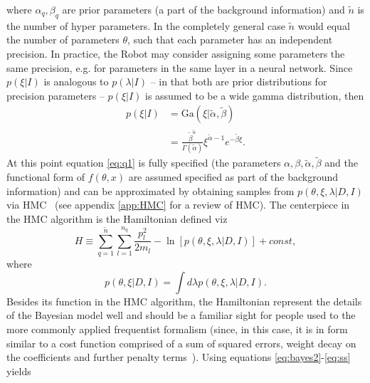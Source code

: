 	where $\alpha_q,\beta_q$ are prior parameters (a part of the background information) and $\tilde{n}$ is the number of hyper parameters. In the completely general case $\tilde{n}$ would equal the number of parameters $\theta$, such that each parameter has an independent precision. In practice, the Robot may consider assigning some parameters the same precision, e.g. for parameters in the same layer in a neural network. Since $p(\xi|I)$ is analogous to $p(\lambda|I)$ -- in that both are prior distributions for precision parameters -- $p(\xi|I)$ is assumed to be a wide gamma distribution, then
	\begin{equation}
		\begin{split}
			p(\xi|I) & = \text{Ga}(\xi|\tilde{\alpha},\tilde{\beta})\\
			& =\frac{\tilde{\beta}^{\tilde{\alpha}}}{\Gamma(\tilde{\alpha})}\xi^{\tilde{\alpha}-1}e^{-\tilde{\beta} \xi}.
		\end{split}
		\label{p7}
	\end{equation}
	At this point equation \eqref{eq:q1} is fully specified (the parameters $\alpha,\beta,\tilde{\alpha},\tilde{\beta}$ and the functional form of $f(\theta,x)$ are assumed specified as part of the background information) and can be approximated by obtaining samples from $p(\theta,\xi,\lambda|D,I)$ via HMC~\citep{Hammersley1964,Duane:1987de,Neal:1996,Neal2012} (see appendix \ref{app:HMC} for a review of HMC). The centerpiece in the HMC algorithm is the Hamiltonian defined viz~\citep{Neal:1996,Neal2012}
	\begin{equation}
		H \equiv  \sum_{q=1}^{\tilde{n}}\sum_{l=1}^{n_q}\frac{p_{l}^2}{2m_{l}}-\ln[p(\theta,\xi,\lambda|D,I)]+const,
		\label{eqh}
	\end{equation}
	where 
	\begin{equation}
		p(\theta,\xi|D,I) = \int d\lambda p(\theta,\xi,\lambda|D,I).
		\label{eq:ss}
	\end{equation}
	Besides its function in the HMC algorithm, the Hamiltonian represent the details of the Bayesian model well and should be a familiar sight for people used to the more commonly applied frequentist formalism (since, in this case, it is in form similar to a cost function comprised of a sum of squared errors, weight decay on the coefficients and further penalty terms~\citep{hastie_09,murphy2013machine,Goodfellow2016}). Using equations \eqref{eq:bayes2}-\eqref{eq:ss} yields
